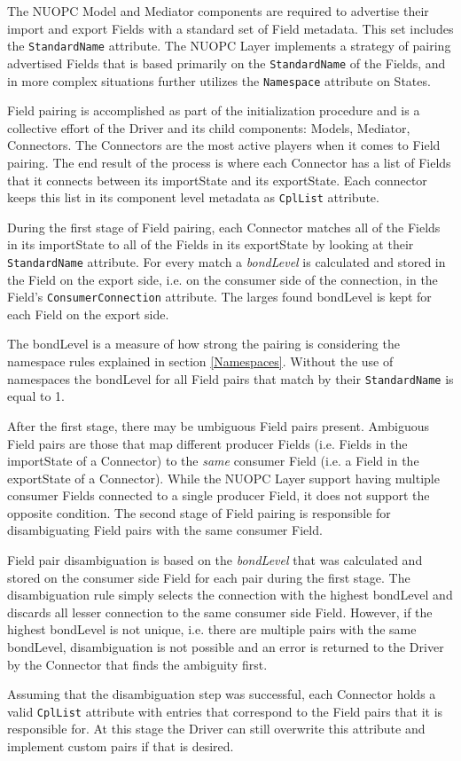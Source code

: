 %

\label{FieldPairing}

The NUOPC Model and Mediator components are required to advertise their import and export Fields with a standard set of Field metadata. This set includes the {\tt StandardName} attribute. The NUOPC Layer implements a strategy of pairing advertised Fields that is based primarily on the {\tt StandardName} of the Fields, and in more complex situations further utilizes the {\tt Namespace} attribute on States.

Field pairing is accomplished as part of the initialization procedure and is a collective effort of the Driver and its child components: Models, Mediator, Connectors. The Connectors are the most active players when it comes to Field pairing. The end result of the process is where each Connector has a list of Fields that it connects between its importState and its exportState. Each connector keeps this list in its component level metadata as {\tt CplList} attribute.

During the first stage of Field pairing, each Connector matches all of the Fields in its importState to all of the Fields in its exportState by looking at their {\tt StandardName} attribute. For every match a {\em bondLevel} is calculated and stored in the Field on the export side, i.e. on the consumer side of the connection, in the Field's {\tt ConsumerConnection} attribute. The larges found bondLevel is kept for each Field on the export side.

The bondLevel is a measure of how strong the pairing is considering the namespace rules explained in section \ref{Namespaces}. Without the use of namespaces the bondLevel for all Field pairs that match by their {\tt StandardName} is equal to 1.

After the first stage, there may be umbiguous Field pairs present. Ambiguous Field pairs are those that map different producer Fields (i.e. Fields in the importState of a Connector) to the {\em same} consumer Field (i.e. a Field in the exportState of a Connector). While the NUOPC Layer support having multiple consumer Fields connected to a single producer Field, it does not support the opposite condition. The second stage of Field pairing is responsible for disambiguating Field pairs with the same consumer Field.

Field pair disambiguation is based on the {\em bondLevel} that was calculated and stored on the consumer side Field for each pair during the first stage. The disambiguation rule simply selects the connection with the highest bondLevel and discards all lesser connection to the same consumer side Field. However, if the highest bondLevel is not unique, i.e. there are multiple pairs with the same bondLevel, disambiguation is not possible and an error is returned to the Driver by the Connector that finds the ambiguity first.

Assuming that the disambiguation step was successful, each Connector holds a valid {\tt CplList} attribute with entries that correspond to the Field pairs that it is responsible for. At this stage the Driver can still overwrite this attribute and implement custom pairs if that is desired.

